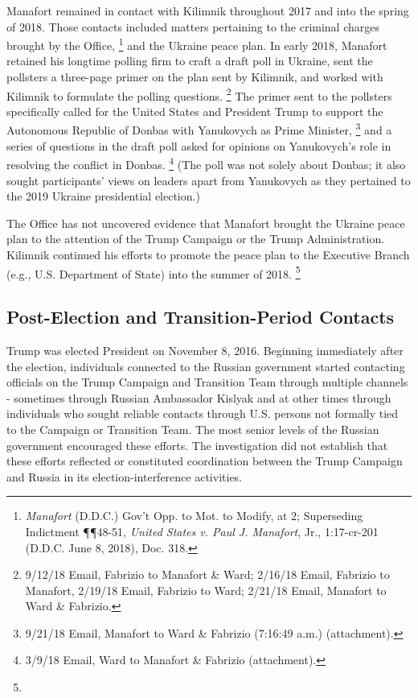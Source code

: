 Manafort remained in contact with Kilimnik throughout 2017 and into the spring of 2018.
Those contacts included matters pertaining to the criminal charges brought by the Office,%
\footnote{\textit{Manafort} (D.D.C.) Gov’t Opp. to Mot. to Modify, at 2;
Superseding Indictment \P\P 48-51, \textit{United States v. Paul J. Manafort}, Jr., 1:17-cr-201 (D.D.C. June 8, 2018), Doc. 318.}
and the Ukraine peace plan.
In early 2018, Manafort retained his longtime polling firm to craft a draft poll in Ukraine, sent the pollsters a three-page primer on the plan sent by Kilimnik, and worked with Kilimnik to formulate the polling questions.%
\footnote{9/12/18 Email, Fabrizio to Manafort \& Ward;
2/16/18 Email, Fabrizio to Manafort, 2/19/18 Email, Fabrizio to Ward;
2/21/18 Email, Manafort to Ward \& Fabrizio.}
The primer sent to the pollsters specifically called for the United States and President Trump to support the Autonomous Republic of Donbas with Yanukovych as Prime Minister,%
\footnote{9/21/18 Email, Manafort to Ward \& Fabrizio (7:16:49 a.m.) (attachment).}
and a series of questions in the draft poll asked for opinions on Yanukovych's role in resolving the conflict in Donbas.%
\footnote{3/9/18 Email, Ward to Manafort \& Fabrizio (attachment).}
(The poll was not solely about Donbas; it also sought participants' views on leaders apart from Yanukovych as they pertained to the 2019 Ukraine presidential election.)

The Office has not uncovered evidence that Manafort brought the Ukraine peace plan to the attention of the Trump Campaign or the Trump Administration.
Kilimnik continued his efforts to promote the peace plan to the Executive Branch (e.g., U.S. Department of State) into the summer of 2018.%
\footnote{}

\subsection{Post-Election and Transition-Period Contacts}

Trump was elected President on November 8, 2016.
Beginning immediately after the election, individuals connected to the Russian government started contacting officials on the Trump Campaign and Transition Team through multiple channels - sometimes through Russian Ambassador Kislyak and at other times through individuals who sought reliable contacts through U.S. persons not formally tied to the Campaign or Transition Team.
The most senior levels of the Russian government encouraged these efforts.
The investigation did not establish that these efforts reflected or constituted coordination between the Trump Campaign and Russia in its election-interference activities.

